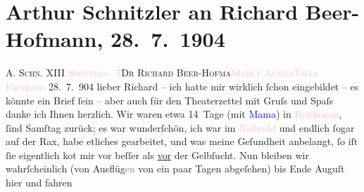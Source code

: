 

               \section[Arthur Schnitzler an Richard Beer-Hofmann, 28. 7. 1904]{ Arthur Schnitzler an Richard Beer-Hofmann, 28. 7. 1904}\nopagebreak{}\rehead{ }\normalsize\beginnumbering{} \toendnotes[C]{\smallbreak\pagebreak[2]} 
\toendnotes[C]{\smallbreak}\pstart{}{\pb}\textsc{A. Schn. XIII \textcolor{pink}{Spöttelg. 7}{}\ledrightnote{\textcolor{pink}{Edmund-Weiß-Gasse}}}\pend{}{\bigskip}\pstart{}{\pb}\textsc{Dr Richard Beer-Hofma{\geminationn}}\pend{}\pstart{}\textsc{\textcolor{pink}{Markt Aussee}{}\ledrightnote{\textcolor{pink}{Bad Aussee}}}\pend{}\pstart{}\textcolor{pink}{\textsc{Villa Frühling}}{}\ledrightnote{\textcolor{pink}{Villa Frühling}}\pend{}{\bigskip}\pstart
           \raggedleft{}{\pb}28. 7. 904\pend
           \pstart
           lieber Richard – ich hatte mir wirklich ſchon eingebildet – es
               könnte ein Brief ſein – aber auch für den Theaterzettel mit Gruſs und Spaſs danke ich
               Ihnen herzlich. Wir waren etwa 14 Tage \introOben{}(\introOben{}mit \textcolor{blue}{Mama}{}\introOben{})\introOben{} in \textcolor{pink}{Reichenau}{}\ledrightnote{\textcolor{pink}{Reichenau an der Rax}}, ſind Samſtag zurück; es war wunderſchön,
                  {\pb}ich war im \textcolor{pink}{Naßwald}{}\ledrightnote{\textcolor{pink}{Nasswald}} und endlich ſogar auf der Rax,
               habe etliches gearbeitet, und was meine Geſundheit anbelangt, ſo iſt ſie eigentlich
                  ko{\geminationm}t mir vor beſſer als \uline{vor} der Gelbſucht. Nun bleiben wir wahrſcheinlich (\introOben{}von\introOben{} Ausflüg\textcolor{gray}{en} von ein paar Tagen abge{\pb}ſehen) bis Ende Auguſt hier und fahren
